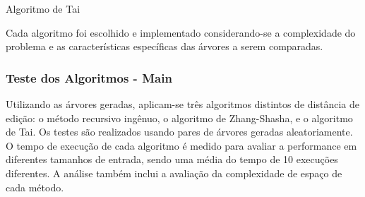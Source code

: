 \documentclass[12pt]{article}
\begin{document}
\begin{algorithm}[H]
\caption{Algoritmo de Tai}
\end{algorithm}

Cada algoritmo foi escolhido e implementado considerando-se a complexidade do problema e as características específicas das árvores a serem comparadas.

\subsubsection{Teste dos Algoritmos - Main}

Utilizando as árvores geradas, aplicam-se três algoritmos distintos de distância de edição: o método recursivo ingênuo, o algoritmo de Zhang-Shasha, e o algoritmo de Tai. Os testes são realizados usando pares de árvores geradas aleatoriamente. O tempo de execução de cada algoritmo é medido para avaliar a performance em diferentes tamanhos de entrada, sendo uma média do tempo de 10 execuções diferentes. A análise também inclui a avaliação da complexidade de espaço de cada método.
\end{document}

